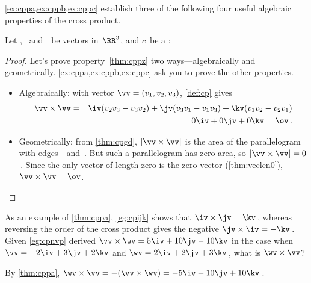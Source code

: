 \cref{ex:cppa,ex:cppb,ex:cppc} establish three of the following four useful algebraic properties of the cross product.

\begin{theorem} \label{thm:cpp}
Let \uv, \vv\ and~\wv\ be vectors in~\(\RR^3\), and \(c\)~be a :
\end{theorem}


\begin{proof} 
Let's prove property~\ref{thm:cppz} two ways---algebraically and geometrically.  \cref{ex:cppa,ex:cppb,ex:cppc} ask you to prove the other properties.
\begin{itemize}
\item Algebraically:  with vector \(\vv=(v_1,v_2,v_3)\),  \cref{def:cp} gives
\begin{eqnarray*}
\vv\times\vv
&=&\iv(v_2v_3-v_3v_2)
+\jv(v_3v_1-v_1v_3)
+\kv(v_1v_2-v_2v_1)
\\&=&0\iv+0\jv+0\kv=\ov\,.
\end{eqnarray*}
\item Geometrically: 
from \cref{thm:cpgd}, \(|\vv\times\vv|\) is the area of the parallelogram with edges~\vv\ and~\vv.
But such a parallelogram has zero area, so \(|\vv\times\vv|=0\)\,.
Since the only vector of length zero is the zero vector (\cref{thm:veclen0}), \(\vv\times\vv=\ov\).
\end{itemize}
\end{proof}





\begin{example} 
As an example of \cref{thm:cppa}, \cref{eg:cpijk} shows that \(\iv\times\jv=\kv\)\,, whereas reversing the order of the cross product gives the negative \(\jv\times\iv=-\kv\)\,.  
Given \cref{eg:cpnvp} derived \(\vv\times\wv=5\iv+10\jv-10\kv\) in the case when \(\vv=-2\iv+3\jv+2\kv\) and \(\wv=2\iv+2\jv+3\kv\)\,, what is \(\wv\times\vv\)?
\begin{solution} 
By \ref{thm:cppa},
\(\wv\times\vv=-(\vv\times\wv)=-5\iv-10\jv+10\kv\)\,.
\end{solution}
\end{example}


